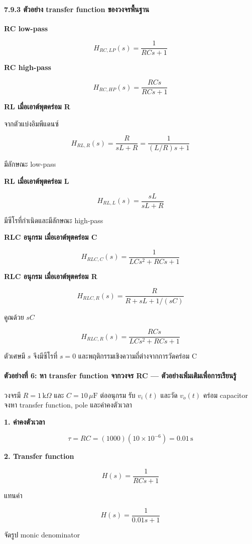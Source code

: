 \paragraph{7.9.3 ตัวอย่าง transfer function ของวงจรพื้นฐาน}

\textbf{RC low-pass}

\[
\boxed{H_{RC,LP}(s)=\frac{1}{RCs+1}}
\]

\textbf{RC high-pass}

\[
\boxed{H_{RC,HP}(s)=\frac{RCs}{RCs+1}}
\]

\textbf{RL เมื่อเอาต์พุตคร่อม R}

จากตัวแบ่งอิมพีแดนซ์

\[
H_{RL,R}(s)=\frac{R}{sL+R}=\frac{1}{(L/R)s+1}
\]

มีลักษณะ low-pass

\textbf{RL เมื่อเอาต์พุตคร่อม L}

\[
H_{RL,L}(s)=\frac{sL}{sL+R}
\]

มีซีโรที่กำเนิดและมีลักษณะ high-pass

\textbf{RLC อนุกรม เมื่อเอาต์พุตคร่อม C}

\[
\boxed{H_{RLC,C}(s)=\frac{1}{LCs^2+RCs+1}}
\]

\textbf{RLC อนุกรม เมื่อเอาต์พุตคร่อม R}

\[
H_{RLC,R}(s)=\frac{R}{R+sL+1/(sC)}
\]

คูณด้วย $sC$

\[
\boxed{H_{RLC,R}(s)=\frac{RCs}{LCs^2+RCs+1}}
\]

ตัวเศษมี $s$ จึงมีซีโรที่ $s=0$ และพฤติกรรมเชิงความถี่ต่างจากการวัดคร่อม C

\paragraph{ตัวอย่างที่ 6: หา transfer function จากวงจร RC — ตัวอย่างเพิ่มเติมเพื่อการเรียนรู้}

วงจรมี $R=1\,\text{k}\Omega$ และ $C=10\,\mu\text{F}$ ต่ออนุกรม รับ $v_i(t)$ และวัด $v_o(t)$ คร่อม capacitor จงหา transfer function, pole และค่าคงตัวเวลา

\textbf{1. ค่าคงตัวเวลา}

\[
\tau=RC=(1000)(10\times10^{-6})=0.01\,\text{s}
\]

\textbf{2. Transfer function}

\[
H(s)=\frac{1}{RCs+1}
\]

แทนค่า

\[
H(s)=\frac{1}{0.01s+1}
\]

จัดรูป monic denominator

